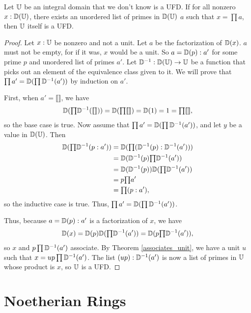 \documentclass[../../math.tex]{subfiles}
\begin{document}
\begin{theorem} \label{div_factorization_ufd}
    Let $\mathbb{U}$ be an integral domain that we don't know is a UFD.  If for all
    nonzero $x : \mathbb{D}(\mathbb{U})$, there exists an unordered list of primes in $\mathbb{D}(\mathbb{U})$
    $a$ such that $x = \prod a$, then $\mathbb{U}$ itself is a UFD.
\end{theorem}
\begin{proof}
    Let $x : \mathbb{U}$ be nonzero and not a unit.  Let $a$ be the factorization of
    $\mathbb{D}(x)$.  $a$ must not be empty, for if it was, $x$ would be a unit.  So $a
    = \mathbb{D}(p) : a'$ for some prime $p$ and unordered list of primes $a'$.  Let
    $\mathbb{D}^{-1} : \mathbb{D}(\mathbb{U}) \to \mathbb{U}$ be a function that picks out an element of the
    equivalence class given to it.  We will prove that $\prod a' =
    \mathbb{D}(\prod\mathbb{D}^{-1}(a'))$ by induction on $a'$.

    First, when $a' = \llbracket \rrbracket$, we have
    \[
        \mathbb{D}({\textstyle \prod}\mathbb{D}^{-1}(\llbracket \rrbracket))
        = \mathbb{D}({\textstyle \prod}\llbracket \rrbracket)
        = \mathbb{D}(1)
        = 1
        = {\textstyle \prod} \llbracket \rrbracket,
    \]
    so the base case is true.  Now assume that $\prod a' =
    \mathbb{D}(\prod\mathbb{D}^{-1}(a'))$, and let $y$ be a value in $\mathbb{D}(\mathbb{U})$.  Then
    \begin{align*}
        \mathbb{D}({\textstyle \prod} \mathbb{D}^{-1}(p : a'))
        &= \mathbb{D}({\textstyle \prod} (\mathbb{D}^{-1}(p) : \mathbb{D}^{-1}(a'))) \\
        &= \mathbb{D}(\mathbb{D}^{-1}(p) {\textstyle \prod} \mathbb{D}^{-1}(a')) \\
        &= \mathbb{D}(\mathbb{D}^{-1}(p)) \mathbb{D}({\textstyle \prod} \mathbb{D}^{-1}(a')) \\
        &= p {\textstyle \prod} a' \\
        &= {\textstyle \prod} (p : a'),
    \end{align*}
    so the inductive case is true.  Thus, $\prod a' = \mathbb{D}(\prod\mathbb{D}^{-1}(a'))$.

    Thus, because $a = \mathbb{D}(p) : a'$ is a factorization of $x$, we have
    \[
        \mathbb{D}(x) = \mathbb{D}(p) \mathbb{D}({\textstyle \prod}\mathbb{D}^{-1}(a'))
        = \mathbb{D}(p {\textstyle \prod}\mathbb{D}^{-1}(a')),
    \]
    so $x$ and $p \prod\mathbb{D}^{-1}(a')$ associate.  By Theorem
    \ref{associates_unit}, we have a unit $u$ such that $x = up
    \prod\mathbb{D}^{-1}(a')$.  The list $(up) : \mathbb{D}^{-1}(a')$ is now a list of primes in
    $\mathbb{U}$ whose product is $x$, so $\mathbb{U}$ is a UFD.
\end{proof}

\section{Noetherian Rings}
\end{document}
